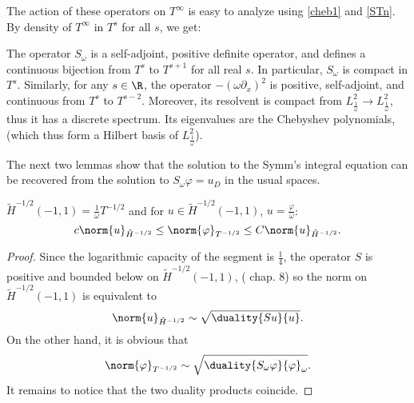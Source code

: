 \documentclass[]{article}
\begin{document}
The action of these operators on $T^{\infty}$ is easy to analyze using \eqref{cheb1} and \autoref{STn}. By density of $T^{\infty}$ in $T^s$ for all $s$, we get:
\begin{Prop}
	The operator $S_\omega$ is a self-adjoint, positive definite operator, and defines a continuous bijection from $T^{s}$ to $T^{s+1}$ for all real $s$. In particular, $S_\omega$ is compact in $T^s$. 
	Similarly, for any $s \in \R$, the operator $-(\omega \partial_x)^2$ is positive, self-adjoint, and continuous from $T^s$ to $T^{s-2}$. Moreover, its resolvent is compact from $L^2_\frac{1}{\omega} \to L^2_\frac{1}{\omega}$, thus it has a discrete spectrum. Its eigenvalues are the Chebyshev polynomials, (which thus form a Hilbert basis of $L^2_\frac{1}{\omega}$). 
\end{Prop}
The next two lemmas show that the solution to the Symm's integral equation can be recovered from the solution to $S_\omega \varphi = u_D$ in the usual spaces. 
\begin{Lem}
	$\tilde{H}^{-1/2}(-1,1) = \frac{1}{\omega}T^{-1/2}$ and for $u \in \tilde{H}^{-1/2}(-1,1)$, $u = \frac{\varphi}{\omega}$:
	\[c\norm{u}_{\tilde{H}^{-1/2}} \leq \norm{\varphi}_{T^{-1/2}} \leq C\norm{u}_{\tilde{H}^{-1/2}}.\] 
	\begin{proof}
		Since the logarithmic capacity of the segment is $\frac{1}{4}$, the operator $S$ is positive and bounded below on $\tilde{H}^{-1/2}(-1,1)$, (\cite{mclean2000strongly} chap. 8)
		so the norm on $\tilde{H}^{-1/2}(-1,1)$ is equivalent to 
		\[\norm{u}_{\tilde{H}^{-1/2}} \sim \sqrt{\duality{Su}{u}}.\]
		On the other hand, it is obvious that
		\[ \norm{\varphi}_{T^{-1/2}} \sim \sqrt{\duality{S_\omega \varphi}{\varphi}_\omega}.\]
		It remains to notice that the two duality products coincide.
	\end{proof}
\end{Lem}
\end{document}
